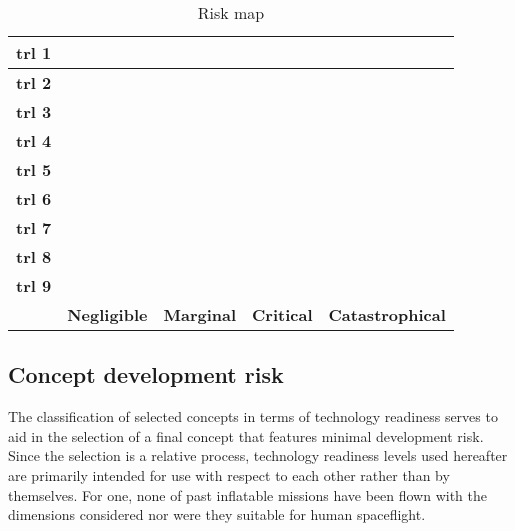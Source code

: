 \begin{table}[H]
	\centering
	\caption{Risk map}
	\label{tab:riskmap}
	\begin{tabular}{|c|c|c|c|c|} %
		\hline
		\textbf{\gls{trl} 1} & \cellcolor{green!70} & \cellcolor{yellow!75} & \cellcolor{red!60} & \cellcolor{red!60} \\ \hline
		\textbf{\gls{trl} 2} & \cellcolor{green!70} & \cellcolor{yellow!75} & \cellcolor{red!60} & \cellcolor{red!60} \\ \hline
		\textbf{\gls{trl} 3} & \cellcolor{green!70} & \cellcolor{yellow!75} & \cellcolor{red!60} & \cellcolor{red!60} \\ \hline
		\textbf{\gls{trl} 4} & \cellcolor{green!70} & \cellcolor{yellow!75} & \cellcolor{yellow!75} & \cellcolor{yellow!75} \\ \hline
		\textbf{\gls{trl} 5} & \cellcolor{green!70} & \cellcolor{green!70} & \cellcolor{yellow!75} & \cellcolor{yellow!75} \\ \hline
		\textbf{\gls{trl} 6} & \cellcolor{green!70} & \cellcolor{green!70} & \cellcolor{green!70} & \cellcolor{green!70} \\ \hline
		\textbf{\gls{trl} 7} & \cellcolor{green!70} & \cellcolor{green!70} & \cellcolor{green!70} & \cellcolor{green!70} \\ \hline
		\textbf{\gls{trl} 8} & \cellcolor{green!70} & \cellcolor{green!70} & \cellcolor{green!70} & \cellcolor{green!70} \\ \hline
		\textbf{\gls{trl} 9} & \cellcolor{green!70} & \cellcolor{green!70} & \cellcolor{green!70} & \cellcolor{green!70} \\ \hline
		 & \textbf{Negligible} & \textbf{Marginal} & \textbf{Critical} & \textbf{Catastrophical} \\ \hline
	\end{tabular}
\end{table}

\subsection{Concept development risk}

The classification of selected concepts in terms of technology readiness serves to aid in the selection of a final concept that features minimal development risk. Since the selection is a relative process, technology readiness levels used hereafter are primarily intended for use with respect to each other rather than by themselves. For one, none of past inflatable missions have been flown with the dimensions considered nor were they suitable for human spaceflight.

